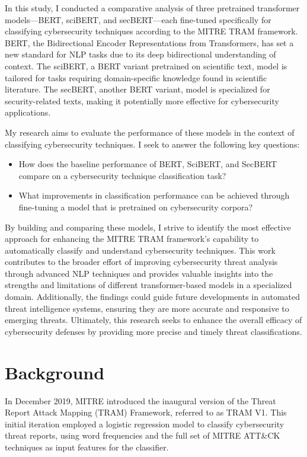 \documentclass[11pt]{article}
\begin{document}
In this study, I conducted a comparative analysis of three pretrained transformer models—BERT, sciBERT, and secBERT—each fine-tuned specifically for classifying cybersecurity techniques according to the MITRE TRAM framework. BERT, the Bidirectional Encoder Representations from Transformers, has set a new standard for NLP tasks due to its deep bidirectional understanding of context. The sciBERT, a BERT variant pretrained on scientific text, model is tailored for tasks requiring domain-specific knowledge found in scientific literature. The secBERT, another BERT variant, model is specialized for security-related texts, making it potentially more effective for cybersecurity applications.

My research aims to evaluate the performance of these models in the context of classifying cybersecurity techniques. I seek to answer the following key questions:

\begin{itemize}
	\item How does the baseline performance of BERT, SciBERT, and SecBERT compare on a cybersecurity technique classification task?
	\item What improvements in classification performance can be achieved through fine-tuning a model that is pretrained on cybersecurity corpora?
\end{itemize}

By building and comparing these models, I strive to identify the most effective approach for enhancing the MITRE TRAM framework's capability to automatically classify and understand cybersecurity techniques. This work contributes to the broader effort of improving cybersecurity threat analysis through advanced NLP techniques and provides valuable insights into the strengths and limitations of different transformer-based models in a specialized domain. Additionally, the findings could guide future developments in automated threat intelligence systems, ensuring they are more accurate and responsive to emerging threats. Ultimately, this research seeks to enhance the overall efficacy of cybersecurity defenses by providing more precise and timely threat classifications.

\section{Background}

In December 2019, MITRE introduced the inaugural version of the Threat Report Attack Mapping (TRAM) Framework, referred to as TRAM V1. This initial iteration employed a logistic regression model to classify cybersecurity threat reports, using word frequencies and the full set of MITRE ATT\&CK techniques as input features for the classifier. 
\end{document}
